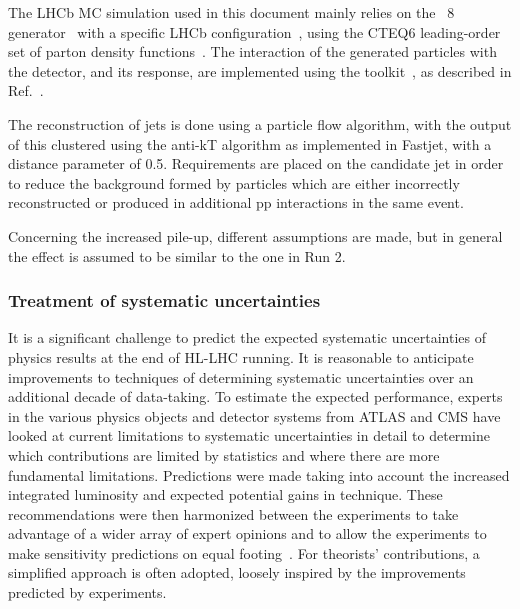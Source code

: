 The LHCb MC simulation used in this document mainly relies on the \pythia~8 generator~\cite{Sjostrand:2007gs} with a specific LHCb configuration~\cite{LHCb-PROC-2010-056}, using the CTEQ6 leading-order set of parton density functions~\cite{cteq6}. The interaction of the generated particles with the detector, and its response, are implemented using the \geant{} toolkit~\cite{Allison:2006ve,Agostinelli:2002hh}, as described in Ref.~\cite{LHCb-PROC-2011-006}. 

The reconstruction of jets is done using a particle flow algorithm, with the output of this clustered using
the anti-kT algorithm as implemented in Fastjet, with a distance parameter of
0.5. Requirements are placed on the candidate jet in order to reduce the background
formed by particles which are either incorrectly reconstructed or produced in additional pp interactions in the same event.

Concerning the increased pile-up, different assumptions are made, but in general the effect is assumed to be similar to the one in Run 2.


\subsubsection{Treatment of systematic uncertainties}
\label{sec:methods:syst}
It is a significant challenge to predict the expected systematic uncertainties of physics results at the end of HL-LHC running.
It is reasonable to anticipate improvements to techniques of determining systematic uncertainties over an additional decade of data-taking.
To estimate the expected performance, experts in the various physics objects and detector systems from ATLAS and CMS have looked at current limitations to
systematic uncertainties in detail to determine which contributions are limited by statistics and where there are more fundamental limitations.
Predictions were made taking into account the increased integrated luminosity and expected potential gains in technique.
These recommendations were then harmonized between the experiments to take advantage of a wider array of expert opinions and to allow the experiments to make sensitivity predictions on equal footing~\cite{ATLAS_PERF_Note,Collaboration:2650976}. For theorists' contributions, a simplified approach is often adopted, loosely inspired by the improvements predicted by experiments. 


